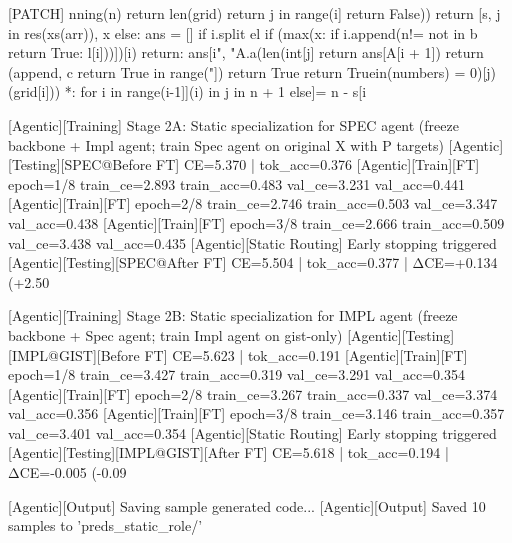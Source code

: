 [PATCH]
nning(n) return len(grid) return j in range(i] return False)) return [s, j in res(xs(arr)), x else: ans = [] if i.split el if (max(x: if i.append(n!= not in b return True: l[i]))])[i) return: ans[i", "A.a(len(int[j] return ans[A[i + 1]) return (append, c return True in range("]) return True return Truein(numbers) = 0)[j)(grid[i])) *: for i in range(i-1]](i) in j in n + 1 else]= n - s[i

[Agentic][Training] Stage 2A: Static specialization for SPEC agent (freeze backbone + Impl agent; train Spec agent on original X with P targets)
[Agentic][Testing][SPEC@Before FT] CE=5.370 | tok_acc=0.376
[Agentic][Train][FT] epoch=1/8 train_ce=2.893 train_acc=0.483 val_ce=3.231 val_acc=0.441
[Agentic][Train][FT] epoch=2/8 train_ce=2.746 train_acc=0.503 val_ce=3.347 val_acc=0.438
[Agentic][Train][FT] epoch=3/8 train_ce=2.666 train_acc=0.509 val_ce=3.438 val_acc=0.435
[Agentic][Static Routing] Early stopping triggered
[Agentic][Testing][SPEC@After FT] CE=5.504 | tok_acc=0.377 | ΔCE=+0.134 (+2.50%

[Agentic][Training] Stage 2B: Static specialization for IMPL agent (freeze backbone + Spec agent; train Impl agent on gist-only)
[Agentic][Testing][IMPL@GIST][Before FT] CE=5.623 | tok_acc=0.191
[Agentic][Train][FT] epoch=1/8 train_ce=3.427 train_acc=0.319 val_ce=3.291 val_acc=0.354
[Agentic][Train][FT] epoch=2/8 train_ce=3.267 train_acc=0.337 val_ce=3.374 val_acc=0.356
[Agentic][Train][FT] epoch=3/8 train_ce=3.146 train_acc=0.357 val_ce=3.401 val_acc=0.354
[Agentic][Static Routing] Early stopping triggered
[Agentic][Testing][IMPL@GIST][After FT] CE=5.618 | tok_acc=0.194 | ΔCE=-0.005 (-0.09%

[Agentic][Output] Saving sample generated code...
[Agentic][Output] Saved 10 samples to 'preds_static_role/'